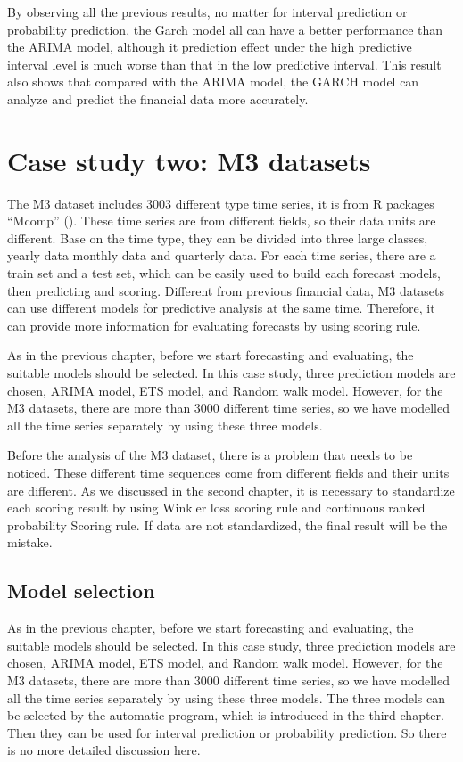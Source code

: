 \documentclass{monashthesis}
\theoremstyle{definition}
\theoremstyle{definition}
\theoremstyle{definition}
\theoremstyle{remark}
\begin{document}
By observing all the previous results, no matter for interval prediction
or probability prediction, the Garch model all can have a better
performance than the ARIMA model, although it prediction effect under
the high predictive interval level is much worse than that in the low
predictive interval. This result also shows that compared with the ARIMA
model, the GARCH model can analyze and predict the financial data more
accurately.

\chapter{Case study two: M3 datasets}\label{case-study-two-m3-datasets}

The M3 dataset includes 3003 different type time series, it is from R
packages ``Mcomp'' (\textcite{RH182}). These time series are from
different fields, so their data units are different. Base on the time
type, they can be divided into three large classes, yearly data monthly
data and quarterly data. For each time series, there are a train set and
a test set, which can be easily used to build each forecast models, then
predicting and scoring. Different from previous financial data, M3
datasets can use different models for predictive analysis at the same
time. Therefore, it can provide more information for evaluating
forecasts by using scoring rule.

As in the previous chapter, before we start forecasting and evaluating,
the suitable models should be selected. In this case study, three
prediction models are chosen, ARIMA model, ETS model, and Random walk
model. However, for the M3 datasets, there are more than 3000 different
time series, so we have modelled all the time series separately by using
these three models.

Before the analysis of the M3 dataset, there is a problem that needs to
be noticed. These different time sequences come from different fields
and their units are different. As we discussed in the second chapter, it
is necessary to standardize each scoring result by using Winkler loss
scoring rule and continuous ranked probability Scoring rule. If data are
not standardized, the final result will be the mistake.

\section{Model selection}\label{model-selection}

As in the previous chapter, before we start forecasting and evaluating,
the suitable models should be selected. In this case study, three
prediction models are chosen, ARIMA model, ETS model, and Random walk
model. However, for the M3 datasets, there are more than 3000 different
time series, so we have modelled all the time series separately by using
these three models. The three models can be selected by the automatic
program, which is introduced in the third chapter. Then they can be used
for interval prediction or probability prediction. So there is no more
detailed discussion here.
\end{document}
